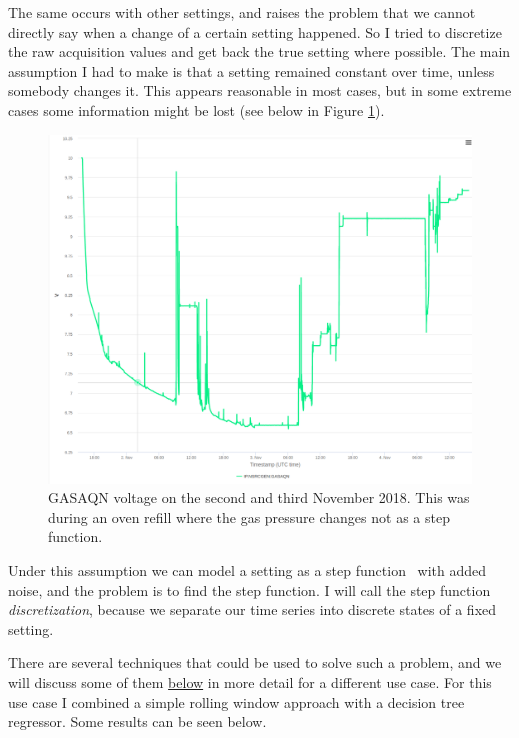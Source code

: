 \documentclass[12pt,a4paper]{article}
\begin{document}
The same occurs with other settings, and raises the problem that we cannot directly say when a change of a certain setting happened. So I
tried to discretize the raw acquisition values and get back the true setting where possible. The main assumption I had to make is that a
setting remained constant over time, unless somebody changes it. This appears reasonable in most cases, but in some extreme cases some
information might be lost (see below in Figure \ref{fig:gasaqn}).

\begin{figure}
\centering
\includegraphics{images/gas_example_02112018.png}
\caption{GASAQN voltage on the second and third November 2018. This was during an oven refill where the gas pressure changes not as a step function.}
\label{fig:gasaqn}
\end{figure}

Under this assumption we can model a setting as a step function~\cite{Weisstein:StepFunction} with added noise, and the problem is to find the step function. I will call the step function \emph{discretization}, because we separate our time series into discrete states of a fixed setting.

There are several techniques that could be used to solve such a problem, and we will discuss some of them \protect\hyperlink{change-point-detection}{below} in more detail for a different use case. For this use case I combined a simple rolling window approach with a decision tree regressor. Some results can be seen below.
\end{document}

